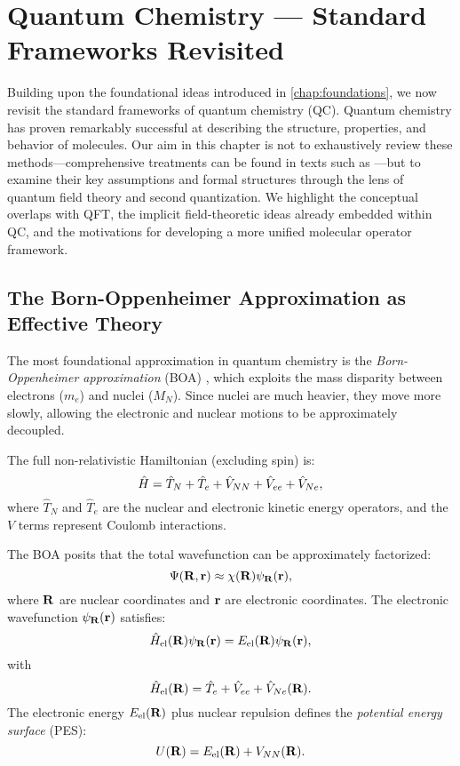 
\chapter{Quantum Chemistry — Standard Frameworks Revisited}
\label{chap:qc_standard}

Building upon the foundational ideas introduced in \cref{chap:foundations}, we now revisit the standard frameworks of quantum chemistry (QC). Quantum chemistry has proven remarkably successful at describing the structure, properties, and behavior of molecules. Our aim in this chapter is not to exhaustively review these methods—comprehensive treatments can be found in texts such as \cite{Szabo1996, Helgaker2000, Jensen2017}—but to examine their key assumptions and formal structures through the lens of quantum field theory and second quantization. We highlight the conceptual overlaps with QFT, the implicit field-theoretic ideas already embedded within QC, and the motivations for developing a more unified molecular operator framework.

\section{The Born-Oppenheimer Approximation as Effective Theory}
\label{sec:qc_bo_approx}

The most foundational approximation in quantum chemistry is the \emph{Born-Oppenheimer approximation} (BOA) \cite{Born1927}, which exploits the mass disparity between electrons (\(m_e\)) and nuclei (\(M_N\)). Since nuclei are much heavier, they move more slowly, allowing the electronic and nuclear motions to be approximately decoupled.

The full non-relativistic Hamiltonian (excluding spin) is:
\begin{equation}
	\hat{H} = \hat{T}_N + \hat{T}_e + \hat{V}_{NN} + \hat{V}_{ee} + \hat{V}_{Ne},
	\label{eq:full_hamiltonian}
\end{equation}
where \(\hat{T}_N\) and \(\hat{T}_e\) are the nuclear and electronic kinetic energy operators, and the \(V\) terms represent Coulomb interactions.

The BOA posits that the total wavefunction can be approximately factorized:
\[
\Psi(\vb{R}, \vb{r}) \approx \chi(\vb{R}) \psi_{\vb{R}}(\vb{r}),
\]
where \(\vb{R}\) are nuclear coordinates and \(\vb{r}\) are electronic coordinates. The electronic wavefunction \(\psi_{\vb{R}}(\vb{r})\) satisfies:
\begin{equation}
	\hat{H}_{\text{el}}(\vb{R}) \psi_{\vb{R}}(\vb{r}) = E_{\text{el}}(\vb{R}) \psi_{\vb{R}}(\vb{r}),
	\label{eq:electronic_schrodinger}
\end{equation}
with
\[
\hat{H}_{\text{el}}(\vb{R}) = \hat{T}_e + \hat{V}_{ee} + \hat{V}_{Ne}(\vb{R}).
\]
The electronic energy \(E_{\text{el}}(\vb{R})\) plus nuclear repulsion defines the \emph{potential energy surface} (PES):
\[
U(\vb{R}) = E_{\text{el}}(\vb{R}) + V_{NN}(\vb{R}).
\]

